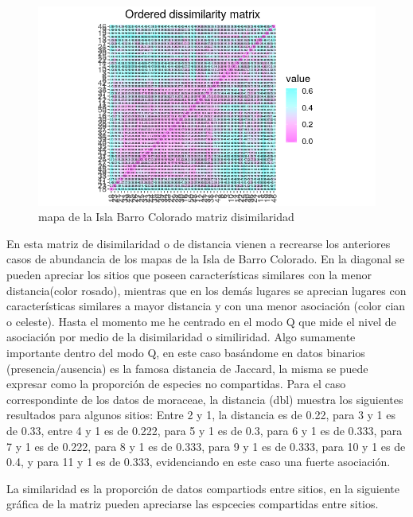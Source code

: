 \documentclass[11pt,]{article}
\begin{document}
\begin{figure}
\centering
\includegraphics[width=1.00000\textwidth]{matrizdedisimilaridad.png}
\caption{mapa de la Isla Barro Colorado matriz disimilaridad
\label{fig:bci_map}}
\end{figure}

En esta matriz de disimilaridad o de distancia vienen a recrearse los
anteriores casos de abundancia de los mapas de la Isla de Barro
Colorado. En la diagonal se pueden apreciar los sitios que poseen
características similares con la menor distancia(color rosado), mientras
que en los demás lugares se aprecian lugares con características
similares a mayor distancia y con una menor asociación (color cian o
celeste). Hasta el momento me he centrado en el modo Q que mide el nivel
de asociación por medio de la disimilaridad o similiridad. Algo
sumamente importante dentro del modo Q, en este caso basándome en datos
binarios (presencia/ausencia) es la famosa distancia de Jaccard, la
misma se puede expresar como la proporción de especies no compartidas.
Para el caso correspondinte de los datos de moraceae, la distancia (dbl)
muestra los siguientes resultados para algunos sitios: Entre 2 y 1, la
distancia es de 0.22, para 3 y 1 es de 0.33, entre 4 y 1 es de 0.222,
para 5 y 1 es de 0.3, para 6 y 1 es de 0.333, para 7 y 1 es de 0.222,
para 8 y 1 es de 0.333, para 9 y 1 es de 0.333, para 10 y 1 es de 0.4, y
para 11 y 1 es de 0.333, evidenciando en este caso una fuerte
asociación.

La similaridad es la proporción de datos compartiods entre sitios, en la
siguiente gráfica de la matriz pueden apreciarse las espcecies
compartidas entre sitios.
\end{document}

